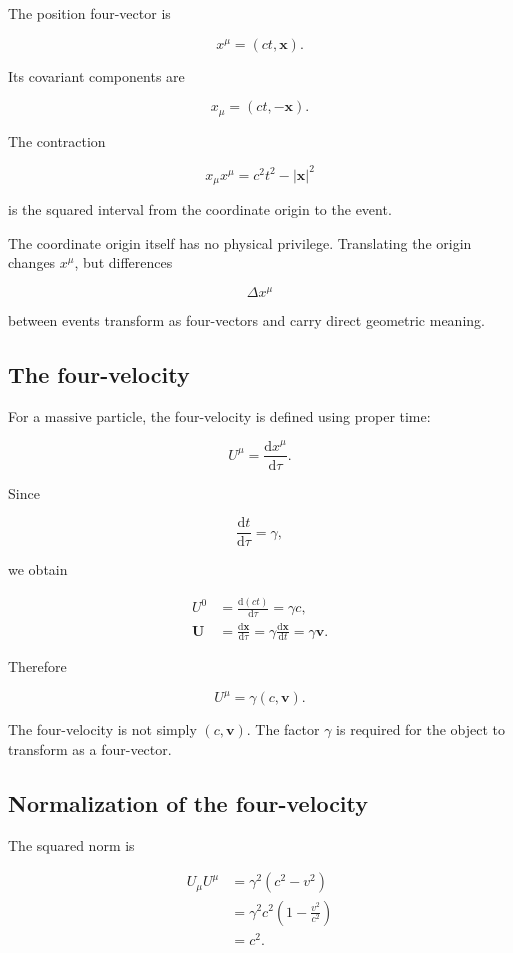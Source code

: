 The position four-vector is

\[
\boxed{
x^{\mu}=(ct,\mathbf{x})
}.
\]

Its covariant components are

\[
\boxed{
x_{\mu}=(ct,-\mathbf{x})
}.
\]

The contraction

\[
x_{\mu}x^{\mu}
=
c^{2}t^{2}-|\mathbf{x}|^{2}
\]

is the squared interval from the coordinate origin to the event.

The coordinate origin itself has no physical privilege. Translating the origin changes \(x^{\mu}\), but differences

\[
\Delta x^{\mu}
\]

between events transform as four-vectors and carry direct geometric meaning.

\subsection{The four-velocity}

For a massive particle, the four-velocity is defined using proper time:

\[
\boxed{
U^{\mu}
=
\frac{\mathrm{d}x^{\mu}}{\mathrm{d}\tau}
}.
\]

Since

\[
\frac{\mathrm{d}t}{\mathrm{d}\tau}
=
\gamma,
\]

we obtain

\[
\begin{aligned}
U^{0}
&=
\frac{\mathrm{d}(ct)}{\mathrm{d}\tau}
=
\gamma c,\\
\mathbf{U}
&=
\frac{\mathrm{d}\mathbf{x}}{\mathrm{d}\tau}
=
\gamma\frac{\mathrm{d}\mathbf{x}}{\mathrm{d}t}
=
\gamma\mathbf{v}.
\end{aligned}
\]

Therefore

\[
\boxed{
U^{\mu}
=
\gamma(c,\mathbf{v})
}.
\]

The four-velocity is not simply \((c,\mathbf{v})\). The factor \(\gamma\) is required for the object to transform as a four-vector.

\subsection{Normalization of the four-velocity}

The squared norm is

\[
\begin{aligned}
U_{\mu}U^{\mu}
&=
\gamma^{2}
(c^{2}-v^{2})\\
&=
\gamma^{2}c^{2}
\left(1-
\frac{v^{2}}{c^{2}}
\right)\\
&=
c^{2}.
\end{aligned}
\]


